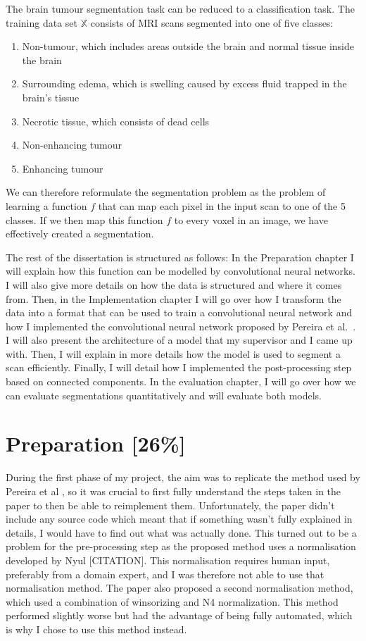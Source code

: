 \documentclass[12pt,a4paper,twoside,openright]{report}
\begin{document}
The brain tumour segmentation task can be reduced to a classification task. The training data set $\mathbb{X}$ consists of MRI scans segmented into one of five classes:
\begin{enumerate}
	\item Non-tumour, which includes areas outside the brain and normal tissue inside the brain
	\item Surrounding edema, which is swelling caused by excess fluid trapped in the brain's tissue
	\item Necrotic tissue, which consists of dead cells
	\item Non-enhancing tumour
	\item Enhancing tumour
\end{enumerate} 
We can therefore reformulate the segmentation problem as the problem of learning a function $f$ that can map each pixel in the input scan to one of the 5 classes. If we then map this function $f$ to every voxel in an image, we have effectively created a segmentation.

The rest of the dissertation is structured as follows: In the Preparation chapter I will explain how this function can be modelled by convolutional neural networks. I will also give more details on how the data is structured and where it comes from. Then, in the Implementation chapter I will go over how I transform the data into a format that can be used to train a convolutional neural network and how I implemented the convolutional neural network proposed by Pereira et al.\ \cite{pereira}. I will also present the architecture of a model that my supervisor and I came up with. Then, I will explain in more details how the model is used to segment a scan efficiently. Finally, I will detail how I implemented the post-processing step based on connected components. In the evaluation chapter, I will go over how we can evaluate segmentations quantitatively and will evaluate both models.

\chapter{Preparation [26\%]}
During the first phase of my project, the aim was to replicate the method used by Pereira et al \cite{pereira}, so it was crucial to first fully understand the steps taken in the paper to then be able to reimplement them. Unfortunately, the paper didn't include any source code which meant that if something wasn't fully explained in details, I would have to find out what was actually done. This turned out to be a problem for the pre-processing step as the proposed method uses a normalisation developed by Nyul [CITATION]. This normalisation requires human input, preferably from a domain expert, and I was therefore not able to use that normalisation method. The paper also proposed a second normalisation method, which used a combination of winsorizing and N4 normalization. This method performed slightly worse but had the advantage of being fully automated, which is why I chose to use this method instead.\\
\end{document}
